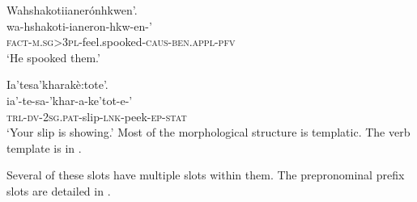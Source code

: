 \documentclass[output=paper,colorlinks,citecolor=brown]{langscibook}
\begin{document}
\ea\label{ex:moh:3}
    \glll Wahshakotiianerónhkwen’. \\ 
         wa-hshakoti-ianeron-hkw-en-’ \\
         \textsc{fact-m.sg>3pl}-feel.spooked-\textsc{caus-ben.appl-pfv} \\
    \glt ‘He spooked them.’
\z 

\ea\label{ex:moh:4}
    \glll Ia’tesa’kharakè:tote’. \\ 
         ia’-te-sa-’khar-a-ke’tot-e-’ \\
         \textsc{trl-dv-2sg.pat}-slip-\textsc{lnk-}peek-\textsc{ep-stat} \\
    \glt ‘Your slip is showing.’
\z 
Most of the morphological structure is templatic. The verb template is in .

\begin{table}
\caption{Basic verb template}
\label{tab:moh:1}
\end{table}
Several of these slots have multiple slots within them. The prepronominal prefix slots are detailed in .
\end{document}
